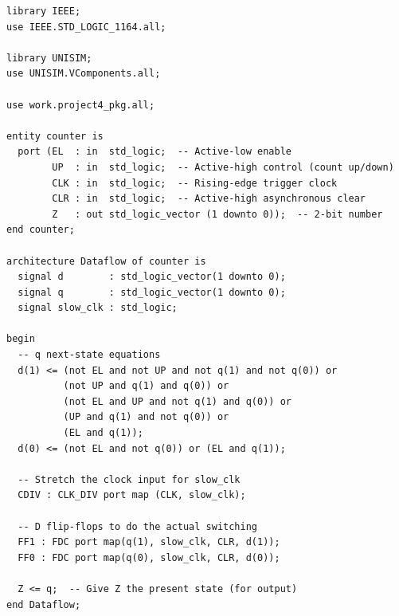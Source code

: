 \documentclass{report}
\begin{document}
\begin{verbatim}
library IEEE;
use IEEE.STD_LOGIC_1164.all;

library UNISIM;
use UNISIM.VComponents.all;

use work.project4_pkg.all;

entity counter is
  port (EL  : in  std_logic;  -- Active-low enable
        UP  : in  std_logic;  -- Active-high control (count up/down)
        CLK : in  std_logic;  -- Rising-edge trigger clock
        CLR : in  std_logic;  -- Active-high asynchronous clear
        Z   : out std_logic_vector (1 downto 0));  -- 2-bit number
end counter;

architecture Dataflow of counter is
  signal d        : std_logic_vector(1 downto 0);
  signal q        : std_logic_vector(1 downto 0);
  signal slow_clk : std_logic;

begin
  -- q next-state equations
  d(1) <= (not EL and not UP and not q(1) and not q(0)) or
          (not UP and q(1) and q(0)) or
          (not EL and UP and not q(1) and q(0)) or
          (UP and q(1) and not q(0)) or
          (EL and q(1));
  d(0) <= (not EL and not q(0)) or (EL and q(1));

  -- Stretch the clock input for slow_clk
  CDIV : CLK_DIV port map (CLK, slow_clk);

  -- D flip-flops to do the actual switching
  FF1 : FDC port map(q(1), slow_clk, CLR, d(1));
  FF0 : FDC port map(q(0), slow_clk, CLR, d(0));

  Z <= q;  -- Give Z the present state (for output)
end Dataflow;
\end{verbatim}
\end{document}
